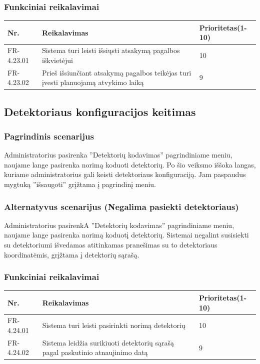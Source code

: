 \documentclass[oneside]{VUMIFPSkursinis}
\begin{document}
	\subsubsection{Funkciniai reikalavimai}
	\begin{table}[htbp]
		\begin{tabularx}{1\textwidth}{ |P{2.5cm}|X|P{3cm }| }  \hline
			Nr. & Reikalavimas & Prioritetas(1-10) \\ \hline
			FR-4.23.01 & Sistema turi leisti išsiųsti atsakymą pagalbos iškvietėjui & 10 \\ \hline
			FR-4.23.02 & Prieš išsiunčiant atsakymą pagalbos teikėjas turi įvesti planuojamą atvykimo laiką & 9 \\ \hline
		\end{tabularx}
	\end{table}
	
	\subsection{Detektoriaus konfiguracijos keitimas}
	\subsubsection{Pagrindinis scenarijus}
	Administratorius pasirenka ''Detektorių kodavimas'' pagrindiniame meniu, naujame lange pasirenka norimą koduoti detektorių. Po šio veiksmo iššoka langas, kuriame administratorius gali keisti detektoriaus konfiguraciją. Jam paspaudus mygtuką ''išsaugoti'' grįžtama į pagrindinį meniu.
	\subsubsection{Alternatyvus scenarijus (Negalima pasiekti detektoriaus)}
	Administratorius pasirenkA ''Detektorių kodavimas'' pagrindiniame meniu, naujame lange pasirenka norimą koduotį detektorių. Sistemai negalint susisiekti su detektoriumi išvedamas atitinkamas pranešimas su to detektoriaus koordinatėmis, grįžtama į detektorių sąrašą.
	\subsubsection{Funkciniai reikalavimai}
	\begin{table}[htbp]
		\begin{tabularx}{1\textwidth}{ |P{2.5cm}|X|P{3cm }| }  \hline
			Nr. & Reikalavimas & Prioritetas(1-10) \\ \hline
			FR-4.24.01 &  Sistema turi leisti pasirinkti norimą detektorių & 10 \\ \hline
			FR-4.24.02 &  Sistema leidžia surikiuoti detektorių sąrašą pagal paskutinio atnaujinimo datą & 9 \\ \hline
		\end{tabularx}
	\end{table}
\end{document}
